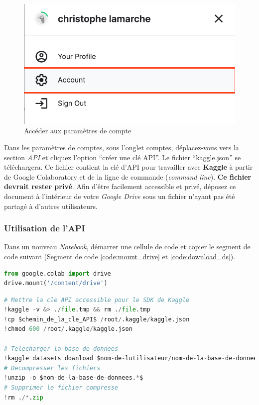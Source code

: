 \documentclass{article}
\begin{document}
\bigbreak
\begin{figure}[H]
  \centering
  \includegraphics[width=0.5\columnwidth]{figures/account_settings.png}
  \caption{Accéder aux paramètres de compte}
  \label{fig:account_settings}
\end{figure}

\bigbreak
Dans les paramètres de comptes, sous l'onglet comptes, déplacez-vous vers la section \textit{API} et cliquez l'option ``créer une clé API''. Le fichier ``kaggle.json'' se téléchargera. Ce fichier contient la clé d'API pour travailler avec \textbf{Kaggle} à partir de Google Colaboratory et de la ligne de commande (\textit{command line}). \textbf{Ce fichier devrait rester privé}. Afin d'être facilement accessible et privé, déposez ce document à l'intérieur de votre \textit{Google Drive} sous un fichier n'ayant pas été partagé à d'autres utilisateurs.

\subsubsection{Utilisation de l'API}
Dans un nouveau \textit{Notebook}, démarrer une cellule de code et copier le segment de code suivant (Segment de code \ref{code:mount_drive} et \ref{code:download_ds}).

\begin{lstlisting}[language=Python, caption={Connecter le notebook avec Google Drive}, label={code:mount_drive}]
from google.colab import drive
drive.mount('/content/drive')
\end{lstlisting}

\bigbreak
\begin{lstlisting}[language=Python, caption={Télécharger la base de données avec Kaggle}, label={code:download_ds}]
# Mettre la cle API accessible pour le SDK de Kaggle
!kaggle -v &> ./file.tmp && rm ./file.tmp
!cp $chemin_de_la_cle_API$ /root/.kaggle/kaggle.json
!chmod 600 /root/.kaggle/kaggle.json

# Telecharger la base de donnees
!kaggle datasets download $nom-de-lutilisateur/nom-de-la-base-de-donnees$
# Decompresser les fichiers
!unzip -o $nom-de-la-base-de-donnees.*$
# Supprimer le fichier compresse
!rm ./*.zip
\end{lstlisting}
\end{document}
